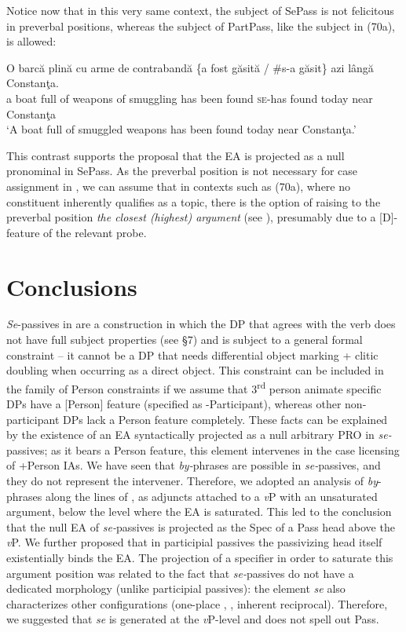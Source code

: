 \documentclass[output=paper]{langsci/langscibook}
\begin{document}
Notice now that in this very same context, the subject of SePass is not felicitous in preverbal positions, whereas the subject of PartPass, like the subject in (70a), is allowed:

\ea%
    \label{ex:giurgea:71}
    \gll O barcă plină cu arme   de contrabandă \{a  fost găsită  / \#s-a    găsit\} azi    lângă Constanţa.\\
         a boat   full   of weapons of smuggling  has been found {} \textsc{se-}has found today near  Constanţa\\
    \glt ‘A boat full of smuggled weapons has been found today near Constanţa.’
    \z

This contrast supports the proposal that the EA is projected as a null pronominal in SePass. As the preverbal position is not necessary for case assignment in , we can assume that in contexts such as (70a), where no constituent inherently qualifies as a topic, there is the option of raising to the preverbal position \textit{the closest (highest) argument} (see \citealt{Giurgea2017}), presumably due to a [D]-feature of the relevant probe.  

\section{Conclusions}%
\textit{Se}{}-passives in  are a construction in which the DP that agrees with the verb does not have full subject properties (see §7) and is subject to a general formal constraint – it cannot be a DP that needs differential object marking + clitic doubling when occurring as a direct object. This constraint can be included in the family of Person constraints if we assume that 3\textsuperscript{rd} person animate specific DPs have a [Person] feature (specified as -Participant), whereas other non-participant DPs lack a Person feature completely. These facts can be explained by the existence of an EA syntactically projected as a null arbitrary PRO in \textit{se-}passives; as it bears a Person feature, this element intervenes in the case licensing of +Person IAs. We have seen that \textit{by-}phrases are possible in \textit{se-}passives, and they do not represent the intervener. Therefore, we adopted an analysis of \textit{by}{}-phrases along the lines of \citet{Bruening2012}, as adjuncts attached to a \textit{v}P with an unsaturated argument, below the level where the EA is saturated. This led to the conclusion that the null EA of \textit{se-}passives is projected as the Spec of a Pass head above the \textit{v}P. We further proposed that in participial passives the passivizing head itself existentially binds the EA. The projection of a specifier in order to saturate this argument position was related to the fact that \textit{se-}passives do not have a dedicated morphology (unlike participial passives): the element \textit{se} also characterizes other  configurations (one-place , , inherent reciprocal). Therefore, we suggested that \textit{se} is generated at the \textit{v}P-level and does not spell out Pass.
 
\end{document}
